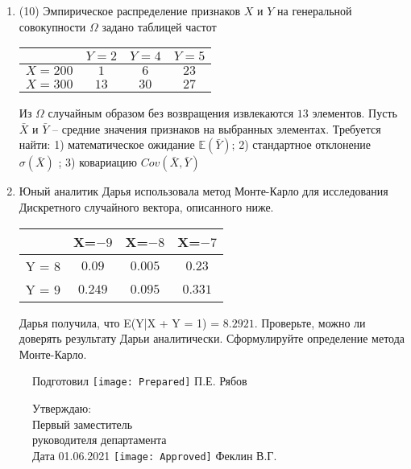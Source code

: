 \documentclass[a4paper,10pt]{article}
\begin{document}
\begin{enumerate}
\item


(10) Эмпирическое распределение признаков $X$ и $Y$ на генеральной совокупности $\Omega$ задано таблицей частот  
 
\begin{tabular}{ | c | c | c | c | }
\hline
 & $Y = 2$ & $Y = 4$ & $Y = 5$  \\ \hline
$X = 200$ & $1$ & $6$ & $23$\\ \hline
$X = 300$ & $13$ & $30$ & $27$\\
\hline
\end{tabular}

Из $\Omega$ случайным образом без возвращения извлекаются $13$ элементов. 
Пусть $\bar X$ и $\bar Y$ – средние значения признаков на выбранных элементах. 
Требуется найти: 1) математическое ожидание $\mathbb{E}(\bar Y)$; 2) стандартное отклонение $\sigma(\bar X)$ ; 
3) ковариацию $Cov(\bar X, \bar Y)$


\item

    
    	Юный аналитик Дарья использовала метод Монте-Карло для исследования Дискретного случайного вектора, описанного ниже.

        \begin{tabular}{|c|c|c|c|}
	\hline
	& X=$-9$ & X=$-8$ & X=$-7$ \\
	\hline
	Y = $8$ & $0.09$ & $0.005$  &  $0.23$ \\
	\hline
	Y = $9$ & $0.249$ & $0.095$ & $0.331$  \\
	\hline
\end{tabular}

    	Дарья получила, что E(Y|X + Y = 1) = $8.2921$.
    	Проверьте, можно ли доверять результату Дарьи аналитически. Сформулируйте определение метода Монте-Карло.
    

\end{enumerate}

\begin{figure}[H]
	Подготовил
	\hfill
	\texttt{[image: Prepared]}
	П.Е. Рябов
\end{figure}


\begin{figure}[H]
	Утверждаю:\\
	Первый заместитель\\
	руководителя департамента\\
	Дата 01.06.2021
	\hfill
	\texttt{[image: Approved]}
	Феклин В.Г.
\end{figure}
\end{document}
